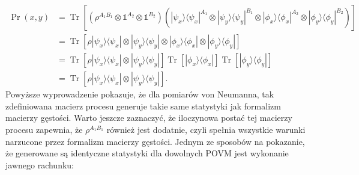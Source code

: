 \documentclass[10pt]{article} %
\DeclareMathOperator{\Trs}{Tr}
\newcommand{\Ket}[1]{|#1\rangle}
\newcommand{\Bra}[1]{\langle#1|}
\newcommand{\I}{\mathbb{1}}
\begin{document}
\begin{equation}
\begin{split}
\Pr(x,y) &= \Trs\left[ (\rho^{A_1B_1} \otimes \I^{A_2} \otimes \I^{B_2}) (\Ket{\psi_x}\Bra{\psi_x}^{A_1} \otimes \Ket{\psi_y}\Bra{\psi_y}^{B_1} \otimes \Ket{\phi_x}\Bra{\phi_x}^{A_2} \otimes \Ket{\phi_y}\Bra{\phi_y}^{B_2})\right] \\
&= \Trs\left[ \rho \Ket{\psi_x}\Bra{\psi_x}\otimes\Ket{\psi_y}\Bra{\psi_y} \otimes \Ket{\phi_x}\Bra{\phi_x}\otimes\Ket{\phi_y}\Bra{\phi_y}\right] \\
&= \Trs\left[ \rho \Ket{\psi_x}\Bra{\psi_x}\otimes\Ket{\psi_y}\Bra{\psi_y}\right] \Trs\left[\Ket{\phi_x}\Bra{\phi_x}\right] \Trs\left[\Ket{\phi_y}\Bra{\phi_y}\right]
\\
&= \Trs\left[ \rho \Ket{\psi_x}\Bra{\psi_x}\otimes\Ket{\psi_y}\Bra{\psi_y}\right].
\end{split}
\end{equation}
Powyższe wyprowadzenie pokazuje, że dla pomiarów von Neumanna, tak zdefiniowana macierz procesu generuje takie same statystyki jak formalizm macierzy gęstości. Warto jeszcze zaznaczyć, że iloczynowa postać tej macierzy procesu zapewnia, że $\rho^{A_1B_1}$ również jest dodatnie, czyli spełnia wszystkie warunki narzucone przez formalizm macierzy gęstości. Jednym ze sposobów na pokazanie, że generowane są identyczne statystyki dla dowolnych POVM jest wykonanie jawnego rachunku:
\end{document}
